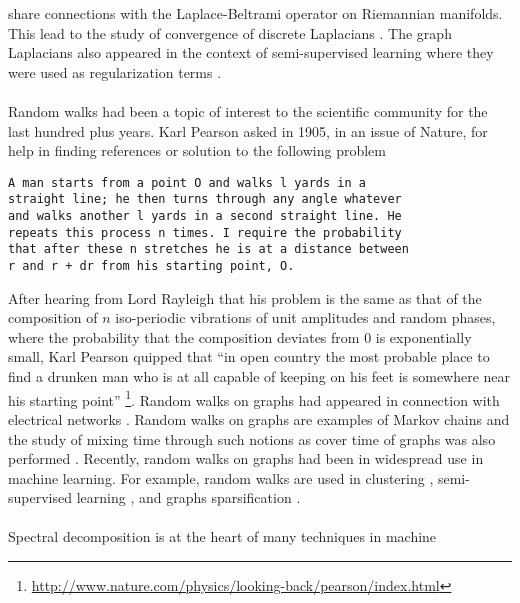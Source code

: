 share connections with the Laplace-Beltrami operator on Riemannian
manifolds. This lead to the study of convergence of discrete
Laplacians
\citep{hein05:_from,luxburg08:_consis,belkin08:_towar_theor_found_laplac,
  hein07:_conver_laplac,coifman06:_diffus_maps}. The graph Laplacians
also appeared in the context of semi-supervised learning where they
were used as regularization terms
\citep{zhu03:_semi_super_learn_using_gauss,belkin06:_manif_regul,zhu05:_semi_super}. \\ \\
%
\noindent
Random walks had been a topic of interest to the scientific community
for the last hundred plus years. Karl Pearson asked in
1905, in an issue of
Nature, for help in finding references or solution to the following
problem
\begin{verbatim}
A man starts from a point O and walks l yards in a
straight line; he then turns through any angle whatever 
and walks another l yards in a second straight line. He 
repeats this process n times. I require the probability 
that after these n stretches he is at a distance between
r and r + dr from his starting point, O.
\end{verbatim}
After hearing from Lord Rayleigh that his problem is the same as that
of the composition of $n$ iso-periodic vibrations of unit amplitudes
and random phases, where the probability that the composition deviates
from $0$ is exponentially small, Karl Pearson quipped that ``in open
country the most probable place to find a drunken man who is at all
capable of keeping on his feet is somewhere near his starting point''
\footnote{\url{http://www.nature.com/physics/looking-back/pearson/index.html}}.
Random walks on graphs had appeared in connection with electrical
networks
\citep{doyle84:_random_walks_elect_networ,lyons:_probab_trees_networ}. Random
walks on graphs are examples of Markov chains and the study of mixing
time through such notions as cover time of graphs was also performed
\citep{lovasz96:_random_graph,levin09:_markov_chain_mixin_times}. Recently,
random walks on graphs had been in widespread use in machine
learning. For example, random walks are used in clustering
\citep{saerens04,yen07:_graph,qui07:_clust}, semi-supervised learning
\citep{szummer01:_partial_markov,zhou04:_learn,zhou04:_learn_label_unlab,zhu03:_semi_super_learn_using_gauss},
and graphs sparsification
\citep{spielmand08:_graph}. \\ \\
%
\noindent
Spectral decomposition is at the heart of many techniques in machine
